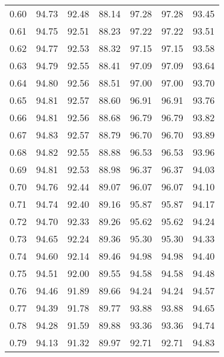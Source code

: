 \begin{tabular}{|c|c|c|c|c|c|c|}
      0.60 &     94.73 &     92.48 &      88.14 &   97.28 &      97.28 &         93.45 \\
      0.61 &     94.75 &     92.51 &      88.23 &   97.22 &      97.22 &         93.51 \\
      0.62 &     94.77 &     92.53 &      88.32 &   97.15 &      97.15 &         93.58 \\
      0.63 &     94.79 &     92.55 &      88.41 &   97.09 &      97.09 &         93.64 \\
      0.64 &     94.80 &     92.56 &      88.51 &   97.00 &      97.00 &         93.70 \\
      0.65 &     94.81 &     92.57 &      88.60 &   96.91 &      96.91 &         93.76 \\
      0.66 &     94.81 &     92.56 &      88.68 &   96.79 &      96.79 &         93.82 \\
      0.67 &     94.83 &     92.57 &      88.79 &   96.70 &      96.70 &         93.89 \\
      0.68 &     94.82 &     92.55 &      88.88 &   96.53 &      96.53 &         93.96 \\
      0.69 &     94.81 &     92.53 &      88.98 &   96.37 &      96.37 &         94.03 \\
      0.70 &     94.76 &     92.44 &      89.07 &   96.07 &      96.07 &         94.10 \\
      0.71 &     94.74 &     92.40 &      89.16 &   95.87 &      95.87 &         94.17 \\
      0.72 &     94.70 &     92.33 &      89.26 &   95.62 &      95.62 &         94.24 \\
      0.73 &     94.65 &     92.24 &      89.36 &   95.30 &      95.30 &         94.33 \\
      0.74 &     94.60 &     92.14 &      89.46 &   94.98 &      94.98 &         94.40 \\
      0.75 &     94.51 &     92.00 &      89.55 &   94.58 &      94.58 &         94.48 \\
      0.76 &     94.46 &     91.89 &      89.66 &   94.24 &      94.24 &         94.57 \\
      0.77 &     94.39 &     91.78 &      89.77 &   93.88 &      93.88 &         94.65 \\
      0.78 &     94.28 &     91.59 &      89.88 &   93.36 &      93.36 &         94.74 \\
      0.79 &     94.13 &     91.32 &      89.97 &   92.71 &      92.71 &         94.83 \\

\end{tabular}
